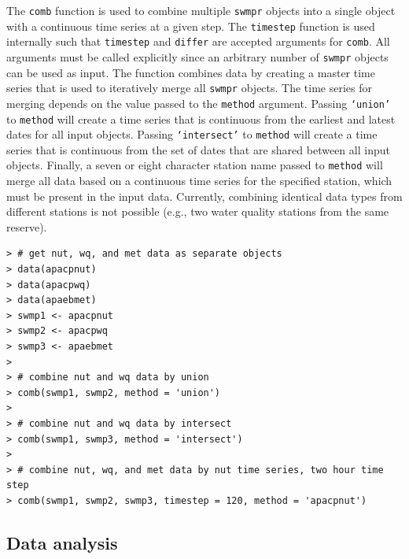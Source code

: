 \documentclass[10pt,letterpaper]{article}\usepackage[]{graphicx}\usepackage[]{color}
\makeatletter
\newenvironment{kframe}{%
 \def\at@end@of@kframe{}%
 \ifinner\ifhmode%
  \def\at@end@of@kframe{\end{minipage}}%
  \begin{minipage}{\columnwidth}%
 \fi\fi%
 \def\FrameCommand##1{\hskip\@totalleftmargin \hskip-\fboxsep
 \colorbox{shadecolor}{##1}\hskip-\fboxsep
     \hskip-\linewidth \hskip-\@totalleftmargin \hskip\columnwidth}%
 \MakeFramed {\advance\hsize-\width
   \@totalleftmargin\z@ \linewidth\hsize
   \@setminipage}}%
 {\par\unskip\endMakeFramed%
 \at@end@of@kframe}
\newenvironment{knitrout}{}{} %
\makeatother
\begin{document}
The \texttt{comb} function is used to combine multiple \texttt{swmpr} objects into a single object with a continuous time series at a given step.  The \texttt{timestep} function is used internally such that \texttt{timestep} and \texttt{differ} are accepted arguments for \texttt{comb}.  All arguments must be called explicitly since an arbitrary number of \texttt{swmpr} objects can be used as input.  The function combines data by creating a master time series that is used to iteratively merge all \texttt{swmpr} objects.  The time series for merging depends on the value passed to the \texttt{method} argument.  Passing \texttt{`union'} to \texttt{method} will create a time series that is continuous from the earliest and latest dates for all input objects.  Passing \texttt{`intersect'} to \texttt{method} will create a time series that is continuous from the set of dates that are shared between all input objects.  Finally, a seven or eight character station name passed to \texttt{method} will merge all data based on a continuous time series for the specified station, which must be present in the input data.  Currently, combining identical data types from different stations is not possible (e.g., two water quality stations from the same reserve).  

\begin{knitrout}\small
{}\color{fgcolor}\begin{kframe}
\begin{verbatim}
> # get nut, wq, and met data as separate objects
> data(apacpnut)
> data(apacpwq)
> data(apaebmet)
> swmp1 <- apacpnut
> swmp2 <- apacpwq
> swmp3 <- apaebmet
> 
> # combine nut and wq data by union
> comb(swmp1, swmp2, method = 'union')
> 
> # combine nut and wq data by intersect
> comb(swmp1, swmp3, method = 'intersect')
> 
> # combine nut, wq, and met data by nut time series, two hour time step
> comb(swmp1, swmp2, swmp3, timestep = 120, method = 'apacpnut')
\end{verbatim}
\end{kframe}
\end{knitrout}

\subsection*{Data analysis}
\end{document}
